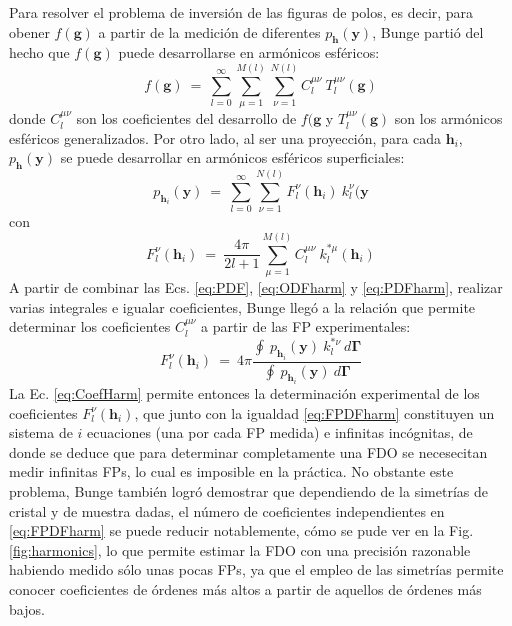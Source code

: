 Para resolver el problema de inversión de las figuras de polos, es decir, para obener $f(\mathbf{g})$ a partir de la medición de diferentes $p_{\mathbf{h}}(\mathbf{y})$, Bunge partió del hecho que $f(\mathbf{g})$ puede desarrollarse en armónicos esféricos:
\begin{equation}
  f(\mathbf{g}) \ = \ \sum_{l=0}^{\infty} \sum_{\mu=1}^{M(l)} \sum_{\nu=1}^{N(l)} C_{l}^{\mu \nu} \ T_{l}^{\mu \nu}(\mathbf{g})
  \label{eq:ODFharm}
\end{equation}
\noindent
donde $C_{l}^{\mu \nu}$ son los coeficientes del desarrollo de $f(\mathbf{g}$ y $T_{l}^{\mu \nu}(\mathbf{g})$ son los armónicos esféricos generalizados.
Por otro lado, al ser una proyección, para cada $\mathbf{h}_i$, $p_{\mathbf{h}}(\mathbf{y})$ se puede desarrollar en armónicos esféricos superficiales:
\begin{equation}
  p_{\mathbf{h}_i}(\mathbf{y}) \ = \ \sum_{l=0}^{\infty} \sum_{\nu=1}^{N(l)} F_{l}^{\nu}(\mathbf{h}_i) \ k_{l}^{\nu}(\mathbf{y}
  \label{eq:PDFharm}
\end{equation}
\noindent
con
\begin{equation}
  F_{l}^{\nu}(\mathbf{h}_i) \ = \ \frac{4 \pi}{2l + 1} \sum_{\mu=1}^{M(l)} C_{l}^{\mu \nu} \ k_{l}^{* \mu}(\mathbf{h}_i)
  \label{eq:FPDFharm}
\end{equation}
\noindent
A partir de combinar las Ecs. \ref{eq:PDF}, \ref{eq:ODFharm} y \ref{eq:PDFharm}, realizar varias integrales e igualar coeficientes, Bunge llegó a la relación que permite determinar los coeficientes $C_{l}^{\mu \nu}$ a partir de las FP experimentales\cite{bunge2013texture}:
\begin{equation}
  F_{l}^{\nu}(\mathbf{h}_i) \ = \ 4 \pi \frac{\oint \ p_{\mathbf{h}_i}(\mathbf{y}) \ k_{l}^{* \nu} \ d\mathbf{\Gamma}}{\oint \ p_{\mathbf{h}_i}(\mathbf{y}) \ d\mathbf{\Gamma}}
  \label{eq:CoefHarm}
\end{equation}
\noindent
La Ec. \ref{eq:CoefHarm} permite entonces la determinación experimental de los coeficientes $F_{l}^{\nu}(\mathbf{h}_i)$, que junto con la igualdad \ref{eq:FPDFharm} constituyen un sistema de $i$ ecuaciones (una por cada FP medida) e infinitas incógnitas, de donde se deduce que para determinar completamente una FDO se necesecitan medir infinitas FPs, lo cual es imposible en la práctica.
No obstante este problema, Bunge\cite{bunge2013texture} también logró demostrar que dependiendo de la simetrías de cristal y de muestra dadas, el número de coeficientes independientes en \ref{eq:FPDFharm} se puede reducir notablemente, cómo se pude ver en la Fig. \ref{fig:harmonics}, lo que permite estimar la FDO con una precisión razonable habiendo medido sólo unas pocas FPs, ya que el empleo de las simetrías permite conocer coeficientes de órdenes más altos a partir de aquellos de órdenes más bajos. 
